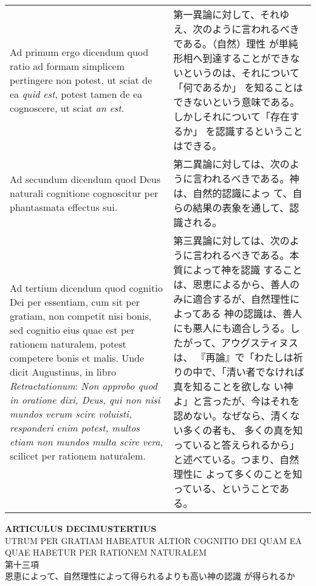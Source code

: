 \documentclass[10pt]{jsarticle} %
\begin{document}
\begin{longtable}{p{21em}p{21em}}
\\



{\sc Ad primum ergo dicendum} quod ratio ad formam simplicem
pertingere non potest, ut sciat de ea {\it quid est}, potest tamen de
ea cognoscere, ut sciat {\it an est}.


&


第一異論に対して、それゆえ、次のように言われるべきである。（自然）理性
が単純形相へ到達することができないというのは、それについて「何であるか」
を知ることはできないという意味である。しかしそれについて「存在するか」
を認識するということはできる。

\\



{\sc Ad secundum dicendum} quod Deus naturali cognitione cognoscitur
per phantasmata effectus sui.


&

第二異論に対しては、次のように言われるべきである。神は、自然的認識によっ
て、自らの結果の表象を通して、認識される。


\\



{\sc Ad tertium dicendum} quod cognitio Dei per essentiam, cum sit per
gratiam, non competit nisi bonis, sed cognitio eius quae est per
rationem naturalem, potest competere bonis et malis. Unde dicit
Augustinus, in libro {\it Retractationum}: {\it Non approbo quod in
oratione dixi, Deus, qui non nisi mundos verum scire voluisti,
responderi enim potest, multos etiam non mundos multa scire vera},
scilicet per rationem naturalem.


&

第三異論に対しては、次のように言われるべきである。本質によって神を認識
することは、恩恵によるから、善人のみに適合するが、自然理性によってある
神の認識は、善人にも悪人にも適合しうる。したがって、アウグスティヌスは、
『再論』で「わたしは祈りの中で、「清い者でなければ真を知ることを欲しな
い神よ」と言ったが、今はそれを認めない。なぜなら、清くない多くの者も、
多くの真を知っていると答えられるから」と述べている。つまり、自然理性に
よって多くのことを知っている、ということである。


\end{longtable}

\newpage
{}

\begin{center}
 {\Large {\bf ARTICULUS DECIMUSTERTIUS}}\\
{\large UTRUM PER GRATIAM HABEATUR ALTIOR COGNITIO DEI QUAM EA QUAE
 HABETUR PER RATIONEM NATURALEM}\\
{\large 第十三項\\恩恵によって、自然理性によって得られるよりも高い神の認識
 が得られるか}
\end{center}
\end{document}
